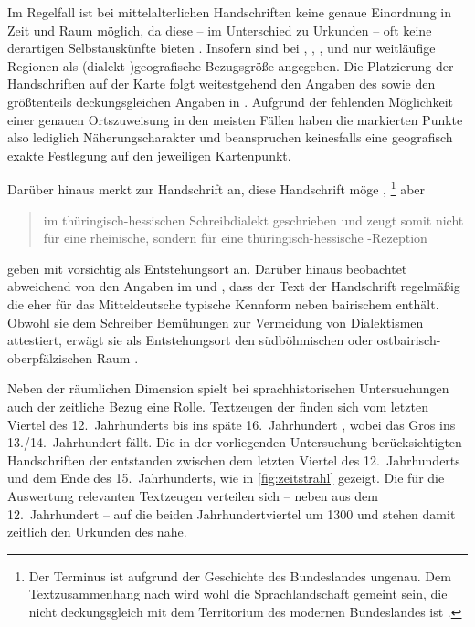 Im Regelfall ist bei mittelalterlichen Handschriften keine genaue Einordnung in
Zeit und Raum möglich, da diese -- im Unterschied zu Urkunden -- oft keine
derartigen Selbstauskünfte bieten
\autocites[1309--1310]{wegera2000}[117--121]{bein2011}. Insofern sind bei
\citet{kc:C1}, \citet{kc:H}, \citet{kc:M}, \citet{kc:P} und \citet{kc:VB} nur
weitläufige Regionen als (dialekt-)geografische Bezugsgröße angegeben.%
Die Platzierung der Handschriften auf der Karte folgt weitestgehend den Angaben
des  \nosh\autocite{hsc} sowie den größtenteils deckungsgleichen
Angaben in \citet{kcdigital,wolf:kckat}. Aufgrund der fehlenden Möglichkeit
einer genauen Ortszuweisung in den meisten Fällen haben die markierten Punkte
also lediglich Näherungscharakter und beanspruchen keinesfalls eine geografisch
exakte Festlegung auf den jeweiligen Kartenpunkt.

Darüber hinaus merkt \citet{klein1988} zur Handschrift \citet{kc:H} an, diese
Handschrift möge ,%
%
	\footnote{Der Terminus  ist aufgrund der Geschichte des
	Bundeslandes ungenau. Dem Textzusammenhang nach wird wohl die
	Sprachlandschaft gemeint sein, die nicht deckungsgleich mit dem Territorium
	des modernen Bundeslandes ist \autocite[vgl.~z.\,B.][853]{wiesinger1983}.}
%
aber \blockcquote[118]{klein1988}{im thüringisch-hessischen Schreibdialekt
geschrieben und zeugt somit nicht für eine rheinische, sondern für eine
thüringisch-hessische \nocite{schroeder1895}-Rezeption}.
\textcites{kcdigital}[23]{wolf:kckat} geben mit
\citet[237--238]{millerzimmermann2007} vorsichtig  als
Entstehungsort an.
%
\label{phsec:vbherkunft}%
Darüber hinaus beobachtet \citeauthor{schneider1987a} abweichend von den
Angaben im  und \citet{kcdigital}, dass der Text der Handschrift
\citet{kc:VB} regelmäßig die eher für das Mitteldeutsche typische Kennform
  neben bairischem  enthält. Obwohl sie dem
Schreiber Bemühungen zur Vermeidung von Dialektismen attestiert, erwägt sie als
Entstehungsort den südböhmischen oder ostbairisch-oberpfälzischen Raum
\autocite[226]{schneider1987a}.

Neben der räumlichen Dimension spielt bei sprachhistorischen Untersuchungen
auch der zeitliche Bezug eine Rolle. Textzeugen der \KC{} finden sich vom
letzten Viertel des 12.~Jahrhunderts \autocites{kc:A1} bis ins späte
16.~Jahrhundert \autocite{kc:T}, wobei das Gros ins 13./14.~Jahrhundert fällt.
Die in der vorliegenden Untersuchung berücksichtigten Handschriften der
\KC{} entstanden zwischen dem letzten Viertel des 12.~Jahrhunderts und dem
Ende des 15.~Jahrhunderts, wie in \cref{fig:zeitstrahl} gezeigt. Die für die
Auswertung relevanten Textzeugen verteilen sich -- neben \citet{kc:A1} aus dem
12.~Jahrhundert -- auf die beiden Jahrhundertviertel um 1300 und stehen damit
zeitlich den Urkunden des \CAO{} nahe.

